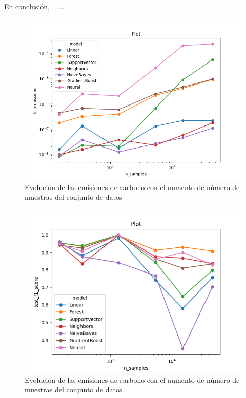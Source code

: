 En conclusión, ...... %



\begin{figure}[H]
  \centerline{
     \includegraphics[width=1\textwidth, keepaspectratio]{img/graph/line-nsamples-emission-log.png}
  }
  \caption{Evolución de las emisiones de carbono con el aumento de número de muestras del conjunto de datos}
  \label{fig:line-emissions-samples}
\end{figure}
\begin{figure}[H]
  \centerline{
     \includegraphics[width=1\textwidth, keepaspectratio]{img/graph/line-nsamples-fscore-loglin.png}
  }
  \caption{Evolución de las emisiones de carbono con el aumento de número de muestras del conjunto de datos}
  \label{fig:line-fscore-samples}
\end{figure}

